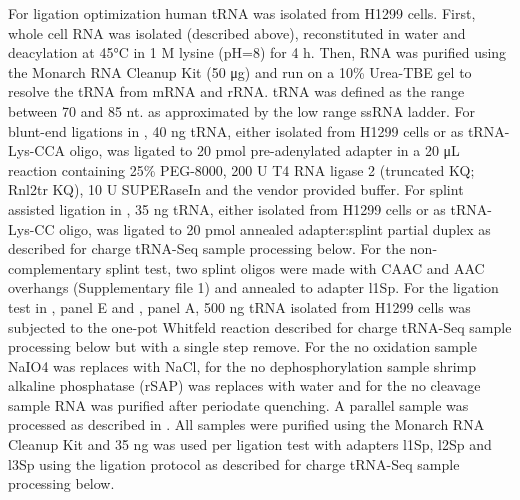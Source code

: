 \documentclass[9pt,lineno]{elife}
\begin{document}
For ligation optimization human tRNA was isolated from H1299 cells.
First, whole cell RNA was isolated (described above), reconstituted in water and deacylation at 45°C in 1 M lysine (pH=8) for 4 h.
Then, RNA was purified using the Monarch RNA Cleanup Kit (50 μg) and run on a 10\% Urea-TBE gel to resolve the tRNA from mRNA and rRNA.
tRNA was defined as the range between 70 and 85 nt. as approximated by the low range ssRNA ladder.
For blunt-end ligations in , 40 ng tRNA, either isolated from H1299 cells or as tRNA-Lys-CCA oligo, was ligated to 20 pmol pre-adenylated adapter in a 20 μL reaction containing 25\% PEG-8000, 200 U T4 RNA ligase 2 (truncated KQ; Rnl2tr KQ), 10 U SUPERaseIn and the vendor provided buffer.
For splint assisted ligation in , 35 ng tRNA, either isolated from H1299 cells or as tRNA-Lys-CC oligo, was ligated to 20 pmol annealed adapter:splint partial duplex as described for charge tRNA-Seq sample processing below.
For the non-complementary splint test, two splint oligos were made with CAAC and AAC overhangs (Supplementary file 1) and annealed to adapter l1Sp.
For the ligation test in , panel E and , panel A, 500 ng tRNA isolated from H1299 cells was subjected to the one-pot Whitfeld reaction described for charge tRNA-Seq sample processing below but with a single step remove.
For the no oxidation sample NaIO4 was replaces with NaCl, for the no dephosphorylation sample shrimp alkaline phosphatase (rSAP) was replaces with water and for the no cleavage sample RNA was purified after periodate quenching.
A parallel sample was processed as described in \cite{Evans2017-st}.
All samples were purified using the Monarch RNA Cleanup Kit and 35 ng was used per ligation test with adapters l1Sp, l2Sp and l3Sp using the ligation protocol as described for charge tRNA-Seq sample processing below.
\end{document}
